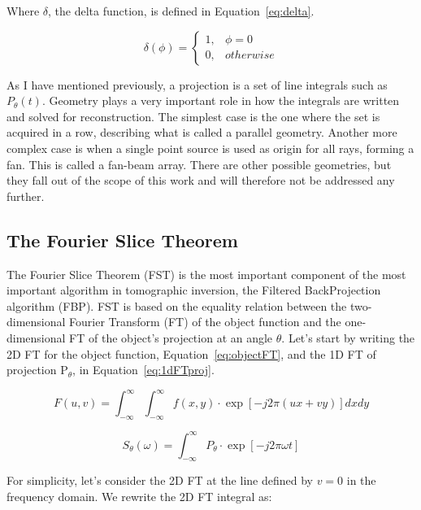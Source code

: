 Where $\delta$, the delta function, is defined in
Equation~\ref{eq:delta}.

\begin{equation}
    \label{eq:delta}
    \delta (\phi) =  
    \begin{cases}
            1, & \phi = 0\\
            0, & otherwise
    \end{cases}
\end{equation}

As I have mentioned previously, a projection is a set of line integrals
such as $P_{\theta}(t)$. Geometry plays a very important role in how the
integrals are written and solved for reconstruction. The simplest case
is the one where the set is acquired in a row, describing what is called
a parallel geometry. Another more complex case is when a single point
source is used as origin for all rays, forming a fan. This is called a
fan-beam array. There are other possible geometries, but they fall out of
the scope of this work and will therefore not be addressed any further.

\subsection{The Fourier Slice Theorem}%
\label{sub:the_fourier_slice_theorem}

The Fourier Slice Theorem (\gls{FST}) is the most important component of
the most important algorithm in tomographic inversion, the Filtered
BackProjection algorithm (\gls{FBP}). \gls{FST} is based on the equality
relation between the 
two-dimensional Fourier Transform (\gls{FT}) of the object function and
the one-dimensional \gls{FT} of the object's projection at an angle
$\theta$. Let's start by writing the 2D \gls{FT} for the object
function, Equation~\ref{eq:objectFT}, and the 1D \gls{FT} of projection
P$_\theta$, in Equation~\ref{eq:1dFTproj}.

\begin{equation}
    \label{eq:objectFT}
    F(u, v) = \int_{-\infty}^{\infty} \int_{-\infty}^{\infty} f(x, y)
    \cdot \exp \left [ -j2\pi (ux + vy) \right ] dx dy 
\end{equation}

\begin{equation}
    \label{eq:1dFTproj}
    S_{\theta}(\omega) = \int_{-\infty}^{\infty} P_{\theta} \cdot \exp\left[
    -j2 \pi \omega t \right]
\end{equation}

For simplicity, let's consider the 2D \gls{FT} at the line defined by
$v=0$ in the frequency domain. We rewrite the 2D \gls{FT} integral as:

